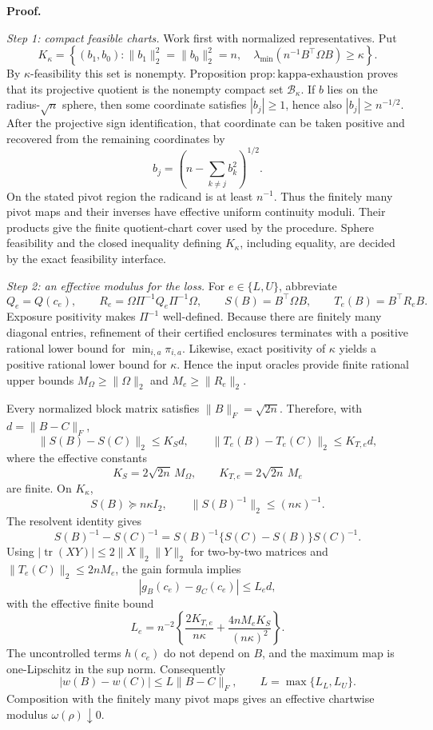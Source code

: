 \textbf{Proof.}

\emph{Step 1: compact feasible charts.}
Work first with normalized representatives.  Put
\[
K_\kappa=
\left\{(b_1,b_0):
\lVert b_1\rVert_2^2=\lVert b_0\rVert_2^2=n,
\quad
\lambda_{\min}\!\left(n^{-1}B^{\top}\Omega B\right)\ge\kappa
\right\}.
\]
By \(\kappa\)-feasibility this set is nonempty.  Proposition \(\mathrm{prop{:}kappa\mbox{-}exhaustion}\) proves that its projective quotient is the nonempty compact set \(\mathcal B_\kappa\).  If \(b\) lies on the radius-\(\sqrt n\) sphere, then some coordinate satisfies \(|b_j|\ge1\), hence also \(|b_j|\ge n^{-1/2}\).  After the projective sign identification, that coordinate can be taken positive and recovered from the remaining coordinates by
\[
b_j=\left(n-\sum_{k\ne j}b_k^2\right)^{1/2}.
\]
On the stated pivot region the radicand is at least \(n^{-1}\).  Thus the finitely many pivot maps and their inverses have effective uniform continuity moduli.  Their products give the finite quotient-chart cover used by the procedure.  Sphere feasibility and the closed inequality defining \(K_\kappa\), including equality, are decided by the exact feasibility interface.

\emph{Step 2: an effective modulus for the loss.}
For \(e\in\{L,U\}\), abbreviate
\[
Q_e=Q(c_e),
\qquad
R_e=\Omega\Pi^{-1}Q_e\Pi^{-1}\Omega,
\qquad
S(B)=B^{\top}\Omega B,
\qquad
T_e(B)=B^{\top}R_eB.
\]
Exposure positivity makes \(\Pi^{-1}\) well-defined.  Because there are finitely many diagonal entries, refinement of their certified enclosures terminates with a positive rational lower bound for \(\min_{i,a}\pi_{i,a}\).  Likewise, exact positivity of \(\kappa\) yields a positive rational lower bound for \(\kappa\).  Hence the input oracles provide finite rational upper bounds \(M_\Omega\ge\lVert\Omega\rVert_2\) and \(M_e\ge\lVert R_e\rVert_2\).

Every normalized block matrix satisfies \(\lVert B\rVert_F=\sqrt{2n}\).  Therefore, with \(d=\lVert B-C\rVert_F\),
\[
\lVert S(B)-S(C)\rVert_2
\le K_Sd,
\qquad
\lVert T_e(B)-T_e(C)\rVert_2
\le K_{T,e}d,
\]
where the effective constants
\[
K_S=2\sqrt{2n}\,M_\Omega,
\qquad
K_{T,e}=2\sqrt{2n}\,M_e
\]
are finite.  On \(K_\kappa\),
\[
S(B)\succeq n\kappa I_2,
\qquad
\lVert S(B)^{-1}\rVert_2\le(n\kappa)^{-1}.
\]
The resolvent identity gives
\[
S(B)^{-1}-S(C)^{-1}
=S(B)^{-1}\{S(C)-S(B)\}S(C)^{-1}.
\]
Using \(|\operatorname{tr}(XY)|\le2\lVert X\rVert_2\lVert Y\rVert_2\) for two-by-two matrices and \(\lVert T_e(C)\rVert_2\le2nM_e\), the gain formula implies
\[
|g_B(c_e)-g_C(c_e)|
\le L_e d,
\]
with the effective finite bound
\[
L_e=n^{-2}\left\{
\frac{2K_{T,e}}{n\kappa}
+\frac{4nM_eK_S}{(n\kappa)^2}
\right\}.
\]
The uncontrolled terms \(h(c_e)\) do not depend on \(B\), and the maximum map is one-Lipschitz in the sup norm.  Consequently
\[
|w(B)-w(C)|\le L\lVert B-C\rVert_F,
\qquad
L=\max\{L_L,L_U\}.
\]
Composition with the finitely many pivot maps gives an effective chartwise modulus \(\omega(\rho)\downarrow0\).

